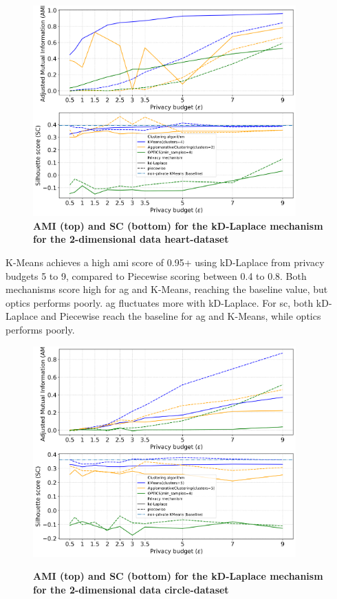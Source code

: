 \begin{figure}[H]
  \centering
  \caption{\textbf{AMI (top) and SC (bottom) for the kD-Laplace mechanism for the 2-dimensional data heart-dataset}}
  \includegraphics[width=0.9\textwidth]{Results/kd-laplace/kd-Laplace/heart-dataset/ami-and-sc_2_dimensions.png}

  \label{fig:validation-heart-dataset_comparison_2d-laplace}
\end{figure}
K-Means achieves a high \gls{ami} score of 0.95+ using kD-Laplace from privacy budgets 5 to 9, compared to Piecewise scoring between 0.4 to 0.8.
Both mechanisms score high for \gls{ag} and K-Means, reaching the baseline value, but \gls{optics} performs poorly.
\gls{ag} fluctuates more with kD-Laplace. For \gls{sc}, both kD-Laplace and Piecewise reach the baseline for \gls{ag} and K-Means, while \gls{optics} performs poorly.
\newpage
\begin{figure}[H]
  \centering
  \caption{\textbf{AMI (top) and SC (bottom) for the kD-Laplace mechanism for the 2-dimensional data circle-dataset}}
  \includegraphics[width=0.9\textwidth]{Results/kd-laplace/kd-Laplace/circle-dataset/ami-and-sc_2_dimensions.png}
  \label{fig:validation-circle-dataset_comparison_2d-laplace}
\end{figure}
